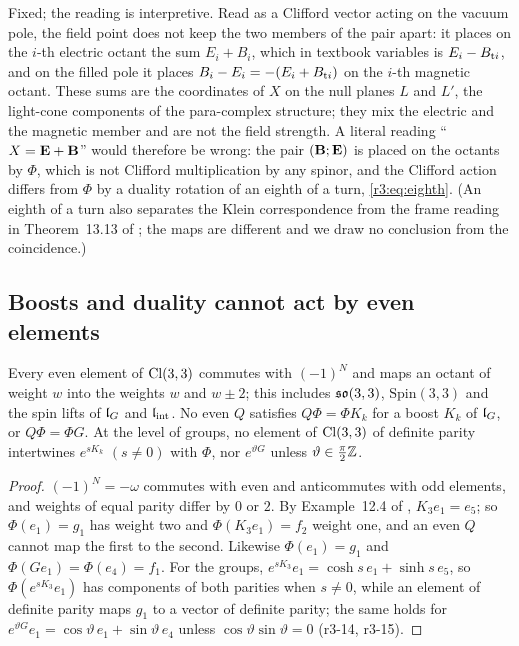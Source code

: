 Fixed; the reading is interpretive. Read as a Clifford vector acting on the vacuum pole, the field point does not keep the two members of
the pair apart: it places on the $i$-th electric octant the sum $E_i+B_i$, which in textbook variables is $E_i-B_{{\rm t}i}$, and on the
filled pole it places $B_i-E_i=-(E_i+B_{{\rm t}i})$ on the $i$-th magnetic octant. These sums are the coordinates of $X$ on the null planes
$L$ and $L'$, the light-cone components of the para-complex structure; they mix the electric and the magnetic member and are not the
field strength. A literal reading ``$X=\mathbf E+\mathbf B$'' would therefore be wrong: the pair $(\mathbf B;\mathbf E)$ is placed on the octants by $\Phi$, which is
not Clifford multiplication by any spinor, and the Clifford action differs from $\Phi$ by a duality rotation of an eighth of a turn,
\cref{r3:eq:eighth}. (An eighth of a turn also separates the Klein correspondence from the frame reading in Theorem~13.13 of \cite{ES17}; the
maps are different and we draw no conclusion from the coincidence.)

\subsection{Boosts and duality cannot act by even elements}
\label{r3:sec:boosts}

\begin{theorem}
\label{r3:thm:noeven}
Every even element of $\mathrm{Cl}(3,3)$ commutes with $(-1)^N$ and maps an octant of weight $w$ into the weights $w$ and $w\pm2$; this includes $\mathfrak{so}(3,3)$,
$\mathrm{Spin}(3,3)$ and the spin lifts of $\mathfrak l_G$ and $\mathfrak l_{\rm int}$. No even $Q$ satisfies $Q\Phi=\Phi K_k$ for a boost $K_k$ of $\mathfrak l_G$, or $Q\Phi=\Phi G$.
At the level of groups, no element of $\mathrm{Cl}(3,3)$ of definite parity intertwines $e^{sK_k}$ $(s\neq0)$ with $\Phi$, nor $e^{\vartheta G}$ unless
$\vartheta\in\tfrac\pi2\mathbb{Z}$.
\end{theorem}

\begin{proof}
$(-1)^N=-\omega$ commutes with even and anticommutes with odd elements, and weights of equal parity differ by $0$ or $2$. By Example~12.4 of
\cite{ES17}, $K_3e_1=e_5$; so $\Phi(e_1)=g_1$ has weight two and $\Phi(K_3e_1)=f_2$ weight one, and an even $Q$ cannot map the first to the
second. Likewise $\Phi(e_1)=g_1$ and $\Phi(Ge_1)=\Phi(e_4)=f_1$. For the groups, $e^{sK_3}e_1=\cosh s\,e_1+\sinh s\,e_5$, so $\Phi(e^{sK_3}e_1)$ has
components of both parities when $s\neq0$, while an element of definite parity maps $g_1$ to a vector of definite parity; the same holds for
$e^{\vartheta G}e_1=\cos\vartheta\,e_1+\sin\vartheta\,e_4$ unless $\cos\vartheta\sin\vartheta=0$ (r3-14, r3-15).
\end{proof}

